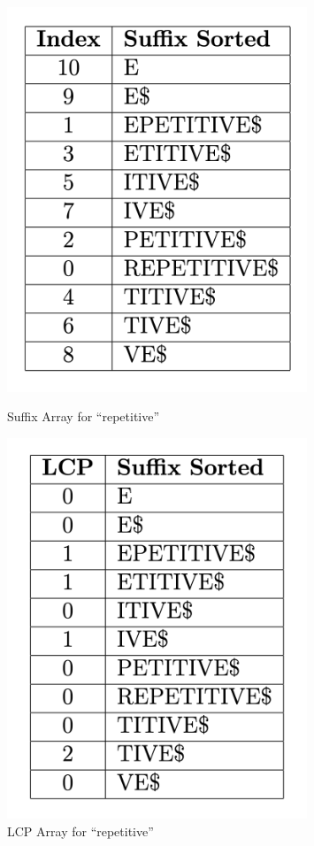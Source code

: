 \documentclass[12pt,letterpaper]{article}
\begin{document}
\begin{figure}[!htb]
    \centering
    \begin{minipage}[t]{0.5\textwidth}
        \centering
        \includegraphics[width=0.8\textwidth]{suffix_array.png}
        \caption{Suffix Array for ``repetitive''}
        \label{fig:suffix_array}
    \end{minipage}%
    \begin{minipage}[t]{0.5\textwidth}
        \centering
        \includegraphics[width=0.8\textwidth]{lcp_array.png}
        \caption{LCP Array for ``repetitive''}
        \label{fig:lcp_array}
    \end{minipage}
\end{figure}
\end{document}
